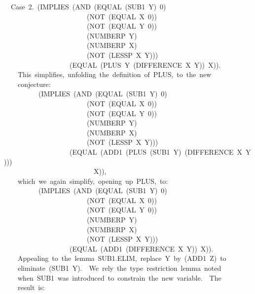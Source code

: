 \documentclass[11pt]{book}
\newenvironment{pubasis}{\begin{flushleft}\ttfamily\small}{\normalsize\rmfamily\end{flushleft}}
\begin{document}
\begin{pubasis}
~~Case~2.~(IMPLIES~(AND~(EQUAL~(SUB1~Y)~0)\\
~~~~~~~~~~~~~~~~~~~~~~~~(NOT~(EQUAL~X~0))\\
~~~~~~~~~~~~~~~~~~~~~~~~(NOT~(EQUAL~Y~0))\\
~~~~~~~~~~~~~~~~~~~~~~~~(NUMBERP~Y)\\
~~~~~~~~~~~~~~~~~~~~~~~~(NUMBERP~X)\\
~~~~~~~~~~~~~~~~~~~~~~~~(NOT~(LESSP~X~Y)))\\
~~~~~~~~~~~~~~~~~~~(EQUAL~(PLUS~Y~(DIFFERENCE~X~Y))~X)).\\

~~~~This~simplifies,~unfolding~the~definition~of~PLUS,~to~the~new\\
~~~~conjecture:\\

~~~~~~~~~~(IMPLIES~(AND~(EQUAL~(SUB1~Y)~0)\\
~~~~~~~~~~~~~~~~~~~~~~~~(NOT~(EQUAL~X~0))\\
~~~~~~~~~~~~~~~~~~~~~~~~(NOT~(EQUAL~Y~0))\\
~~~~~~~~~~~~~~~~~~~~~~~~(NUMBERP~Y)\\
~~~~~~~~~~~~~~~~~~~~~~~~(NUMBERP~X)\\
~~~~~~~~~~~~~~~~~~~~~~~~(NOT~(LESSP~X~Y)))\\
~~~~~~~~~~~~~~~~~~~(EQUAL~(ADD1~(PLUS~(SUB1~Y)~(DIFFERENCE~X~Y)))\\
~~~~~~~~~~~~~~~~~~~~~~~~~~X)),\\

~~~~which~we~again~simplify,~opening~up~PLUS,~to:\\

~~~~~~~~~~(IMPLIES~(AND~(EQUAL~(SUB1~Y)~0)\\
~~~~~~~~~~~~~~~~~~~~~~~~(NOT~(EQUAL~X~0))\\
~~~~~~~~~~~~~~~~~~~~~~~~(NOT~(EQUAL~Y~0))\\
~~~~~~~~~~~~~~~~~~~~~~~~(NUMBERP~Y)\\
~~~~~~~~~~~~~~~~~~~~~~~~(NUMBERP~X)\\
~~~~~~~~~~~~~~~~~~~~~~~~(NOT~(LESSP~X~Y)))\\
~~~~~~~~~~~~~~~~~~~(EQUAL~(ADD1~(DIFFERENCE~X~Y))~X)).\\

~~~~Appealing~to~the~lemma~SUB1.ELIM,~replace~Y~by~(ADD1~Z)~to\\
~~~~eliminate~(SUB1~Y).~~We~rely~the~type~restriction~lemma~noted\\
~~~~when~SUB1~was~introduced~to~constrain~the~new~variable.~~The\\
~~~~result~is:\\


\end{pubasis}
\end{document}
